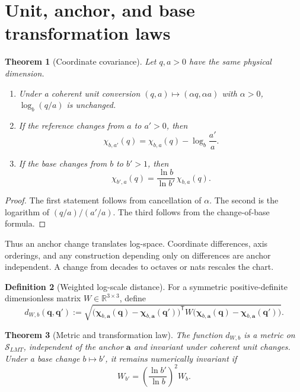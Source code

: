 \documentclass[11pt,a4paper]{article}
\theoremstyle{definition}
\newtheorem{definition}{Definition}[section]
\theoremstyle{plain}
\newtheorem{theorem}[definition]{Theorem}
\theoremstyle{remark}
\newcommand{\R}{\mathbb{R}}
\newcommand{\Scal}{\mathcal{S}}
\begin{document}
\section{Unit, anchor, and base transformation laws}

\begin{theorem}[Coordinate covariance]
\label{thm:coordinate-covariance}
Let $q,a>0$ have the same physical dimension.
\begin{enumerate}[label=(\roman*)]
\item Under a coherent unit conversion
      $(q,a)\mapsto(\alpha q,\alpha a)$ with $\alpha>0$,
      $\log_b(q/a)$ is unchanged.
\item If the reference changes from $a$ to $a'>0$, then
      \[
      \chi_{b,a'}(q)
      =
      \chi_{b,a}(q)-\log_b\frac{a'}a.
      \]
\item If the base changes from $b$ to $b'>1$, then
      \[
      \chi_{b',a}(q)
      =
      \frac{\ln b}{\ln b'}\,\chi_{b,a}(q).
      \]
\end{enumerate}
\end{theorem}

\begin{proof}
The first statement follows from cancellation of $\alpha$. The second is
the logarithm of $(q/a)/(a'/a)$. The third follows from the
change-of-base formula.
\end{proof}

Thus an anchor change translates log-space. Coordinate differences,
axis orderings, and any construction depending only on differences are
anchor independent. A change from decades to octaves or nats rescales
the chart.

\begin{definition}[Weighted log-scale distance]
For a symmetric positive-definite dimensionless matrix
$W\in\R^{3\times3}$, define
\[
d_{W,b}(\bm q,\bm q')
:=
\sqrt{
\bigl(\bm\chi_{b,\bm a}(\bm q)
      -\bm\chi_{b,\bm a}(\bm q')\bigr)^\mathsf T
W
\bigl(\bm\chi_{b,\bm a}(\bm q)
      -\bm\chi_{b,\bm a}(\bm q')\bigr)
}.
\]
\end{definition}

\begin{theorem}[Metric and transformation law]
\label{thm:log-metric}
The function $d_{W,b}$ is a metric on $\Scal_{LMT}$, independent of the
anchor $\bm a$ and invariant under coherent unit changes. Under a base
change $b\mapsto b'$, it remains numerically invariant if
\[
 W_{b'}
 =
 \left(\frac{\ln b'}{\ln b}\right)^2W_b.
\]
\end{theorem}
\end{document}
